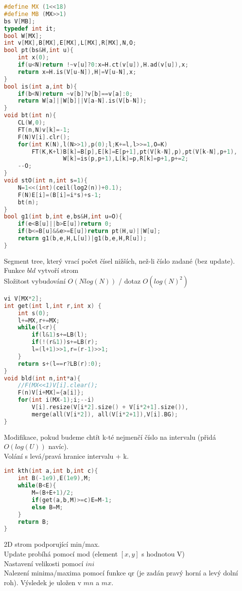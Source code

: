 \documentclass[11pt]{article}
\begin{document}
\begin{lstlisting}[language=C++]
#define MX (1<<18)
#define MB (MX>>1)
bs V[MB];
typedef int it;
bool W[MX];
int v[MX],B[MX],E[MX],L[MX],R[MX],N,O;
bool pt(bs&H,int u){
    int x(0);
    if(u<N)return !~v[u]?0:x=H.ct(v[u]),H.ad(v[u]),x;
    return x=H.is(V[u-N]),H|=V[u-N],x;
}
bool is(int a,int b){
    if(b<N)return ~v[b]?v[b]==v[a]:0;
    return W[a]||W[b]||V[a-N].is(V[b-N]);
}
void bt(int n){
    CL(W,0);
    FT(n,N)v[k]=-1;
    F(N)V[i].clr();
    for(int K(N),l(N>>1),p(0);l;K+=l,l>>=1,O=K)
        FT(K,K+l)B[k]=B[p],E[k]=E[p+1],pt(V[k-N],p),pt(V[k-N],p+1),
                 W[k]=is(p,p+1),L[k]=p,R[k]=p+1,p+=2;
    --O;
}
void stO(int n,int s=1){
    N=1<<(int)(ceil(log2(n))+0.1);
    F(N)E[i]=(B[i]=i*s)+s-1;
    bt(n);
}
bool g1(int b,int e,bs&H,int u=O){
    if(e<B[u]||b>E[u])return 0;
    if(b<=B[u]&&e>=E[u])return pt(H,u)||W[u];
    return g1(b,e,H,L[u])|g1(b,e,H,R[u]);
}
\end{lstlisting}
Segment tree, který vrací počet čísel nižších, než-li číslo zadané (bez update).
\\Funkce $bld$ vytvoří strom
\\Složitost vybudování $O(Nlog(N))$ / dotaz $O(log(N)^2)$
\begin{lstlisting}[language=C++]
vi V[MX*2];
int get(int l,int r,int x) {
    int s(0);
    l+=MX,r+=MX;
    while(l<r){
        if(l&1)s+=LB(l);
        if(!(r&1))s+=LB(r);
        l=(l+1)>>1,r=(r-1)>>1;
    }
    return s+(l==r?LB(r):0);
}
void bld(int n,int*a){
    //F(MX<<1)V[i].clear();
    F(n)V[i+MX]={a[i]};
    for(int i(MX-1);i;--i)
        V[i].resize(V[i*2].size() + V[i*2+1].size()),
        merge(all(V[i*2]), all(V[i*2+1]),V[i].BG);
}
\end{lstlisting}
Modifikace, pokud budeme chtít k-té nejmenčí číslo na intervalu (přidá $O(log(U))$ navíc).
\\Volání s levá/pravá hranice intervalu + k. 
\begin{lstlisting}[language=C++]
int kth(int a,int b,int c){
    int B(-1e9),E(1e9),M;
    while(B<E){
        M=(B+E+1)/2;
        if(get(a,b,M)>=c)E=M-1;
        else B=M;
    }
    return B;
}
\end{lstlisting}
2D strom podporující min/max.
\\Update probíhá pomocí mod (element $[x,y]$ s hodnotou \textsf{V})
\\Nastavení velikosti pomocí $ini$
\\Nalezení minima/maxima pomocí funkce qr (je zadán pravý horní a levý dolní roh). Výsledek je uložen v $mn$ a $mx$.
\end{document}
